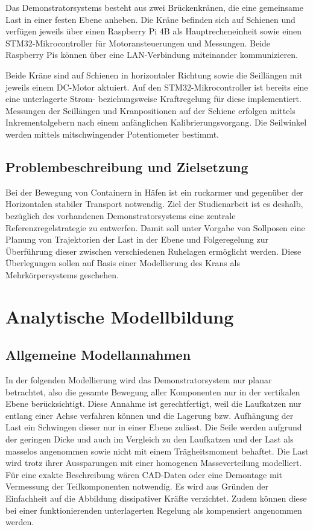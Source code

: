 Das Demonstratorsystems besteht aus zwei Brückenkränen, die eine gemeinsame Last in einer festen Ebene anheben. Die Kräne befinden sich auf Schienen und verfügen jeweils über einen Raspberry Pi 4B als Hauptrecheneinheit sowie einen STM32-Mikrocontroller für Motoransteuerungen und Messungen. Beide Raspberry Pis können über eine LAN-Verbindung miteinander kommunizieren.

Beide Kräne sind auf Schienen in horizontaler Richtung sowie die Seillängen mit jeweils einem DC-Motor aktuiert. Auf den STM32-Mikrocontroller ist bereits eine eine unterlagerte Strom- beziehungsweise Kraftregelung für diese implementiert.
Messungen der Seillängen und Kranpositionen auf der Schiene erfolgen mittels Inkrementalgebern nach einem anfänglichen Kalibrierungsvorgang. Die Seilwinkel werden mittels mitschwingender Potentiometer bestimmt.




\section{Problembeschreibung und Zielsetzung}
Bei der Bewegung von Containern in Häfen ist ein ruckarmer und gegenüber der Horizontalen stabiler Transport notwendig. Ziel der Studienarbeit ist es deshalb,  bezüglich des vorhandenen Demonstratorsystems eine zentrale Referenzregelstrategie zu entwerfen. Damit soll unter Vorgabe von Sollposen eine Planung von Trajektorien der Last in der Ebene und Folgeregelung zur Überführung dieser zwischen verschiedenen Ruhelagen ermöglicht werden. Diese Überlegungen sollen auf Basis einer Modellierung des Krans als Mehrkörpersystems geschehen. 

\chapter{Analytische Modellbildung}

\section{Allgemeine Modellannahmen}

In der folgenden Modellierung wird das Demonstratorsystem nur planar betrachtet, also die gesamte Bewegung aller Komponenten nur in der vertikalen Ebene berücksichtigt. Diese Annahme ist gerechtfertigt, weil die Laufkatzen nur entlang einer Achse verfahren können und die Lagerung bzw. Aufhängung der Last ein Schwingen dieser nur in einer Ebene zulässt. Die Seile werden aufgrund der geringen Dicke und auch im Vergleich zu den Laufkatzen und der Last als masselos angenommen sowie nicht mit einem Trägheitsmoment behaftet. Die Last wird trotz ihrer Aussparungen mit einer homogenen Masseverteilung modelliert. Für eine exakte Beschreibung wären CAD-Daten oder eine Demontage mit Vermessung der Teilkomponenten notwendig. Es wird aus Gründen der Einfachheit auf die Abbildung dissipativer Kräfte verzichtet. Zudem können diese bei einer funktionierenden unterlagerten Regelung als kompensiert angenommen werden.

